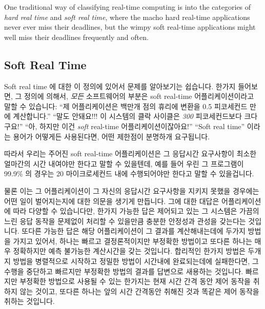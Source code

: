 One traditional way of classifying real-time computing is into the categories
of \emph{hard real time} and \emph{soft real time}, where the macho
hard real-time applications never ever miss their deadlines, but the
wimpy soft real-time applications might well miss their deadlines
frequently and often.
\fi

\subsection{Soft Real Time}
\label{sec:Soft Real Time}

Soft real time 에 대한 이 정의에 있어서 문제를 알아보기는 쉽습니다.
한가지 들어보면, 그 정의에 의해서, \emph{모든} 소프트웨어의 부분은 soft
real-time 어플리케이션이라고 말할 수 있습니다:
``제 어플리케이션은 백만개 점의 휴리에 변환을 0.5 피코세컨드 만에 계산합니다.''
``말도 안돼요!!!
이 시스템의 클락 사이클은 \emph{300} 피코세컨드보다 크다구요!''
``아, 하지만 이건 \emph{soft} real-time 어플리케이션이잖아요!''
``Soft real time'' 이라는 용어가 어떻게든 사용된다면, 어떤 제한점이 분명하개
요구됩니다.

따라서 우리는 주어진 soft real-time 어플리케이션은 그 응답시간 요구사항이
최소한 얼마간의 시간 내여야만 한다고 말할 수 있을텐데, 예를 들어 우린 그
프로그램이 99.9\% 의 경우는 20 마이크로세컨드 내에 수행되어야만 한다고 말할 수
있을겁니다.

물론 이는 그 어플리케이션이 그 자신의 응답시간 요구사항을 지키지 못했을
경우에는 어떤 일이 벌어지는지에 대한 의문을 생기게 만듭니다.
그에 대한 대답은 어플리케이션에 따라 다양할 수 있습니다만, 한가지 가능한 답은
제어되고 있는 그 시스템은 가끔의 느린 응답 동작을 문제없이 처리할 수 있을만큼
충분한 안정성과 관성을 갖는다는 것입니다.
또다른 가능한 답은 해당 어플리케이션이 그 결과를 계산해내는데에 두가지 방법을
가지고 있어서, 하나는 빠르고 결정론적이지만 부정확한 방법이고 또다른 하나는
매우 정확하지만 예측 불가능한 계산시간을 갖는 것입니다.
합리적인 한가지 방법은 두개지 방법을 병렬적으로 시작하고 정밀한 방법이 시간내에
완료되는데에 실패한다면, 그 수행을 중단하고 빠르지만 부정확한 방법의 결과를
답변으로 새용하는 것입니다.
빠르지만 부정확한 방법으로 사용될 수 있는 한가지는 현재 시간 간격 동안 제어
동작을 취하지 않는 것이고, 또다른 하나는 앞의 시간 간격동안 취해진 것과 똑같은
제어 동작을 취하는 것입니다.


